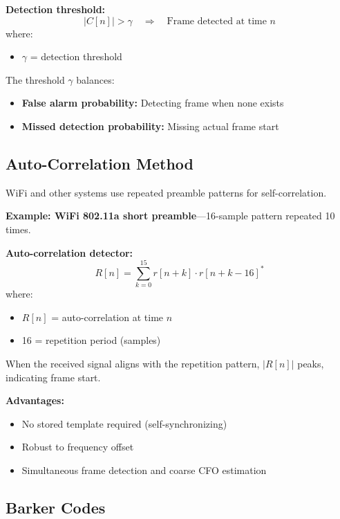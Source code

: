 \textbf{Detection threshold:}
\begin{equation}
|C[n]| > \gamma \quad \Rightarrow \quad \text{Frame detected at time } n
\end{equation}
where:
\begin{itemize}
\item $\gamma$ = detection threshold
\end{itemize}

The threshold $\gamma$ balances:
\begin{itemize}
\item \textbf{False alarm probability:} Detecting frame when none exists
\item \textbf{Missed detection probability:} Missing actual frame start
\end{itemize}

\subsection{Auto-Correlation Method}

WiFi and other systems use repeated preamble patterns for self-correlation.

\textbf{Example: WiFi 802.11a short preamble}---16-sample pattern repeated 10 times.

\textbf{Auto-correlation detector:}
\begin{equation}
R[n] = \sum_{k=0}^{15} r[n+k] \cdot r[n+k-16]^*
\end{equation}
where:
\begin{itemize}
\item $R[n]$ = auto-correlation at time $n$
\item 16 = repetition period (samples)
\end{itemize}

When the received signal aligns with the repetition pattern, $|R[n]|$ peaks, indicating frame start.

\textbf{Advantages:}
\begin{itemize}
\item[\checkmark] No stored template required (self-synchronizing)
\item[\checkmark] Robust to frequency offset
\item[\checkmark] Simultaneous frame detection and coarse CFO estimation
\end{itemize}

\subsection{Barker Codes}

